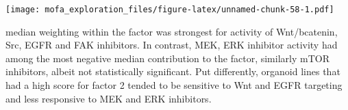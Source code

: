 \documentclass[
]{article}
\newenvironment{Shaded}{\begin{snugshade}}{\end{snugshade}}
\newcommand{\DataTypeTok}[1]{\textcolor[rgb]{0.13,0.29,0.53}{#1}}
\newcommand{\DecValTok}[1]{\textcolor[rgb]{0.00,0.00,0.81}{#1}}
\newcommand{\KeywordTok}[1]{\textcolor[rgb]{0.13,0.29,0.53}{\textbf{#1}}}
\newcommand{\NormalTok}[1]{#1}
\newcommand{\OperatorTok}[1]{\textcolor[rgb]{0.81,0.36,0.00}{\textbf{#1}}}
\newcommand{\OtherTok}[1]{\textcolor[rgb]{0.56,0.35,0.01}{#1}}
\newcommand{\StringTok}[1]{\textcolor[rgb]{0.31,0.60,0.02}{#1}}
\begin{document}
\texttt{[image: mofa\_exploration\_files/figure-latex/unnamed-chunk-58-1.pdf]}

median weighting within the factor was strongest for activity of
Wnt/bcatenin, Src, EGFR and FAK inhibitors. In contrast, MEK, ERK
inhibitor activity had among the most negative median contribution to
the factor, similarly mTOR inhibitors, albeit not statistically
significant. Put differently, organoid lines that had a high score for
factor 2 tended to be sensitive to Wnt and EGFR targeting and less
responsive to MEK and ERK inhibitors.

\begin{Shaded}
\end{Shaded}
\end{document}
